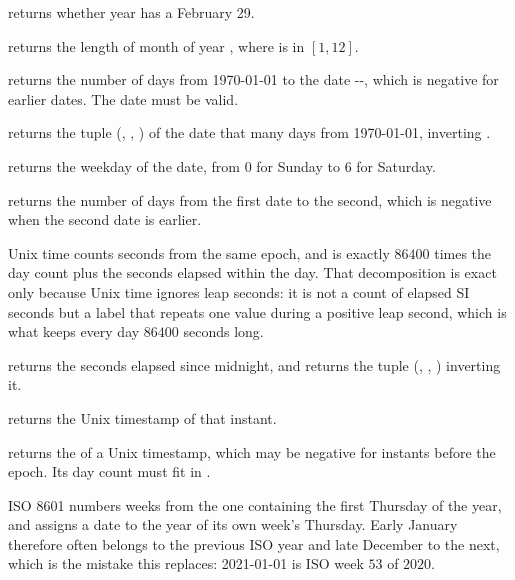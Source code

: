 \begin{compactitem}
  \item {} returns whether year  has a February 29.
  \item {} returns the length of month  of year , where  is in $[1, 12]$.
  \item {} returns the number of days from 1970-01-01 to the date --, which is negative for earlier dates. The date must be valid.
  \item {} returns the tuple (, , ) of the date that many days from 1970-01-01, inverting .
  \item {} returns the weekday of the date, from $0$ for Sunday to $6$ for Saturday.
  \item {} returns the number of days from the first date to the second, which is negative when the second date is earlier.
\end{compactitem}

Unix time counts seconds from the same epoch, and is exactly $86400$ times the day count plus the seconds elapsed within the day. That decomposition is exact only because Unix time ignores leap seconds: it is not a count of elapsed SI seconds but a label that repeats one value during a positive leap second, which is what keeps every day $86400$ seconds long.

\begin{compactitem}
  \item {} returns the seconds elapsed since midnight, and  returns the tuple (, , ) inverting it.
  \item {} returns the Unix timestamp of that instant.
  \item {} returns the  of a Unix timestamp, which may be negative for instants before the epoch. Its day count must fit in .
\end{compactitem}

ISO 8601 numbers weeks from the one containing the first Thursday of the year, and assigns a date to the year of its own week's Thursday. Early January therefore often belongs to the previous ISO year and late December to the next, which is the mistake this replaces: 2021-01-01 is ISO week $53$ of $2020$.

